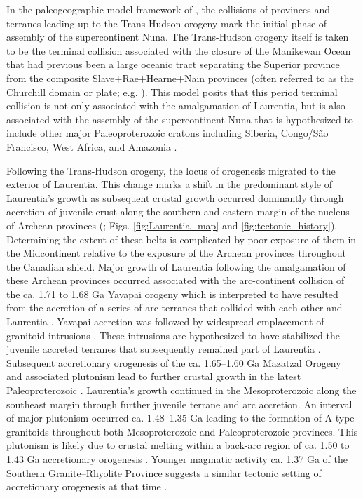 \documentclass[11pt,letterpaper]{article}
\begin{document}
In the paleogeographic model framework of \cite{Pehrsson2015a}, the collisions of provinces and terranes leading up to the Trans-Hudson orogeny mark the initial phase of assembly of the supercontinent Nuna. The Trans-Hudson orogeny itself is taken to be the terminal collision associated with the closure of the Manikewan Ocean that had previous been a large oceanic tract separating the Superior province from the composite Slave+Rae+Hearne+Nain provinces (often referred to as the Churchill domain or plate; e.g. \citealp{Skipton2016a, Weller2017a}). This model posits that this period terminal collision is not only associated with the amalgamation of Laurentia, but is also associated with the assembly of the supercontinent Nuna that is hypothesized to include other major Paleoproterozoic cratons including Siberia, Congo/S\~ao Francisco, West Africa, and Amazonia \citep{Whitmeyer2007a, Pehrsson2015a}. 

Following the Trans-Hudson orogeny, the locus of orogenesis migrated to the exterior of Laurentia. This change marks a shift in the predominant style of Laurentia's growth as subsequent crustal growth occurred dominantly through accretion of juvenile crust along the southern and eastern margin of the nucleus of Archean provinces (\citealp{Whitmeyer2007a}; Figs. \ref{fig:Laurentia_map} and \ref{fig:tectonic_history}). Determining the extent of these belts is complicated by poor exposure of them in the Midcontinent relative to the exposure of the Archean provinces throughout the Canadian shield. Major growth of Laurentia following the amalgamation of these Archean provinces occurred associated with the arc-continent collision of the ca. 1.71 to 1.68 Ga Yavapai orogeny which is interpreted to have resulted from the accretion of a series of arc terranes that collided with each other and Laurentia \citep{Whitmeyer2007a}. Yavapai accretion was followed by widespread emplacement of granitoid intrusions \citep{Whitmeyer2007a}. These intrusions are hypothesized to have stabilized the juvenile accreted terranes that subsequently remained part of Laurentia \citep{Whitmeyer2007a}. Subsequent accretionary orogenesis of the ca. 1.65–1.60 Ga Mazatzal Orogeny and associated plutonism lead to further crustal growth in the latest Paleoproterozoic \citep{Whitmeyer2007a}. Laurentia's growth continued in the Mesoproterozoic along the southeast margin through further juvenile terrane and arc accretion. An interval of major plutonism occurred ca. 1.48–1.35 Ga leading to the formation of A-type granitoids throughout both Mesoproterozoic and Paleoproterozoic provinces. This plutonism is likely due to crustal melting within a back-arc region of ca. 1.50 to 1.43 Ga accretionary orogenesis \citep{Bickford2015a}. Younger magmatic activity ca. 1.37 Ga  of the Southern Granite–Rhyolite Province suggests a similar tectonic setting of accretionary orogenesis at that time \citep{Bickford2015a}. 
\end{document}
